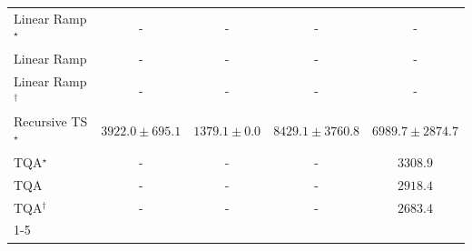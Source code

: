 \begin{tabular}{l|cccc|}
Linear Ramp$^\star$ & {\cellcolor[HTML]{000000}} \color[HTML]{F1F1F1} {\cellcolor{white}} \color{black} - & {\cellcolor[HTML]{000000}} \color[HTML]{F1F1F1} {\cellcolor{white}} \color{black} - & {\cellcolor[HTML]{000000}} \color[HTML]{F1F1F1} {\cellcolor{white}} \color{black} - & {\cellcolor[HTML]{000000}} \color[HTML]{F1F1F1} {\cellcolor{white}} \color{black} - \\
Linear Ramp & {\cellcolor[HTML]{000000}} \color[HTML]{F1F1F1} {\cellcolor{white}} \color{black} - & {\cellcolor[HTML]{000000}} \color[HTML]{F1F1F1} {\cellcolor{white}} \color{black} - & {\cellcolor[HTML]{000000}} \color[HTML]{F1F1F1} {\cellcolor{white}} \color{black} - & {\cellcolor[HTML]{000000}} \color[HTML]{F1F1F1} {\cellcolor{white}} \color{black} - \\
Linear Ramp$^\dagger$ & {\cellcolor[HTML]{000000}} \color[HTML]{F1F1F1} {\cellcolor{white}} \color{black} - & {\cellcolor[HTML]{000000}} \color[HTML]{F1F1F1} {\cellcolor{white}} \color{black} - & {\cellcolor[HTML]{000000}} \color[HTML]{F1F1F1} {\cellcolor{white}} \color{black} - & {\cellcolor[HTML]{000000}} \color[HTML]{F1F1F1} {\cellcolor{white}} \color{black} - \\
Recursive TS$^\star$ & {\cellcolor[HTML]{9CB9D9}} \color[HTML]{000000} $3922.0\pm 695.1$ & {\cellcolor[HTML]{F6EFF7}} \color[HTML]{000000} $1379.1\pm 0.0$ & {\cellcolor[HTML]{023858}} \color[HTML]{F1F1F1} $8429.1\pm 3760.8$ & {\cellcolor[HTML]{0566A0}} \color[HTML]{F1F1F1} $6989.7\pm 2874.7$ \\
TQA$^\star$ & {\cellcolor[HTML]{000000}} \color[HTML]{F1F1F1} {\cellcolor{white}} \color{black} - & {\cellcolor[HTML]{000000}} \color[HTML]{F1F1F1} {\cellcolor{white}} \color{black} - & {\cellcolor[HTML]{000000}} \color[HTML]{F1F1F1} {\cellcolor{white}} \color{black} - & {\cellcolor[HTML]{B9C6E0}} \color[HTML]{000000} $3308.9$ \\
TQA & {\cellcolor[HTML]{000000}} \color[HTML]{F1F1F1} {\cellcolor{white}} \color{black} - & {\cellcolor[HTML]{000000}} \color[HTML]{F1F1F1} {\cellcolor{white}} \color{black} - & {\cellcolor[HTML]{000000}} \color[HTML]{F1F1F1} {\cellcolor{white}} \color{black} - & {\cellcolor[HTML]{CCCFE5}} \color[HTML]{000000} $2918.4$ \\
TQA$^\dagger$ & {\cellcolor[HTML]{000000}} \color[HTML]{F1F1F1} {\cellcolor{white}} \color{black} - & {\cellcolor[HTML]{000000}} \color[HTML]{F1F1F1} {\cellcolor{white}} \color{black} - & {\cellcolor[HTML]{000000}} \color[HTML]{F1F1F1} {\cellcolor{white}} \color{black} - & {\cellcolor[HTML]{D4D4E8}} \color[HTML]{000000} $2683.4$ \\
\cline{1-5}
\bottomrule
\end{tabular}
